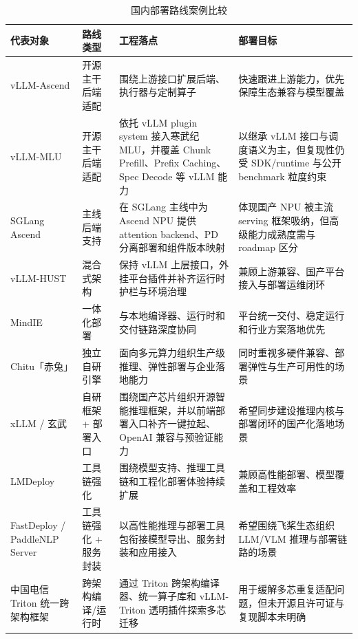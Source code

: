 \begin{table}[t]
\centering
\scriptsize
\setlength{\tabcolsep}{4pt}
\caption{国内部署路线案例比较}
\begin{tabularx}{\linewidth}{>{\raggedright\arraybackslash}p{2.0cm}p{1.7cm}p{2.7cm}Y}
\toprule
代表对象 & 路线类型 & 工程落点 & 部署目标 \\
\midrule
vLLM-Ascend\citep{vllmascend} & 开源主干后端适配 & 围绕上游接口扩展后端、执行器与定制算子 & 快速跟进上游能力，优先保障生态兼容与模型覆盖 \\
vLLM-MLU\citep{vllmmlu} & 开源主干后端适配 & 依托 vLLM plugin system 接入寒武纪 MLU，并覆盖 Chunk Prefill、Prefix Caching、Spec Decode 等 vLLM 能力 & 以继承 vLLM 接口与调度语义为主，但复现性仍受 SDK/runtime 与公开 benchmark 粒度约束 \\
SGLang Ascend\citep{sglang_ascend_npu,sglang_ascend_roadmap_2026} & 主线后端支持 & 在 SGLang 主线中为 Ascend NPU 提供 attention backend、PD 分离部署和组件版本映射 & 体现国产 NPU 被主流 serving 框架吸纳，但高级能力成熟度需与 roadmap 区分 \\
vLLM-HUST\citep{vllmhust} & 混合式架构 & 保持 vLLM 上层接口，外挂平台插件并补齐运行时护栏与环境治理 & 兼顾上游兼容、国产平台接入与部署运维闭环 \\
MindIE\citep{mindie} & 一体化部署 & 与本地编译器、运行时和交付链路深度协同 & 平台统一交付、稳定运行和行业方案落地优先 \\
Chitu「赤兔」\citep{chitu_tsinghua_news,chitu_qingcheng,chitu_github} & 独立自研引擎 & 面向多元算力组织生产级推理、弹性部署与企业落地能力 & 同时重视多硬件兼容、部署弹性与生产可用性的场景 \\
xLLM / 玄武\citep{xllm_docs,xuanwu_tsingmao} & 自研框架 + 部署入口 & 围绕国产芯片组织开源智能推理框架，并以前端部署入口补齐一键拉起、OpenAI 兼容与预验证能力 & 希望同步建设推理内核与部署闭环的国产化落地场景 \\
LMDeploy\citep{lmdeploy} & 工具链强化 & 围绕模型支持、推理工具链和工程化部署体验持续扩展 & 兼顾高性能部署、模型覆盖和工程效率 \\
FastDeploy / PaddleNLP Server\citep{fastdeploy,paddlenlp_llm_server} & 工具链强化 + 服务封装 & 以高性能推理与部署工具包衔接模型导出、服务封装和应用接入 & 希望围绕飞桨生态组织 LLM/VLM 推理与部署链路的场景 \\
中国电信 Triton 统一跨架构框架\citep{chinatelecom_triton_validation_2025} & 跨架构编译/运行时 & 通过 Triton 跨架构编译器、统一算子库和 vLLM-Triton 透明插件探索多芯迁移 & 用于缓解多芯重复适配问题，但未开源且许可证与复现脚本未明确 \\
\bottomrule
\end{tabularx}
\end{table}

